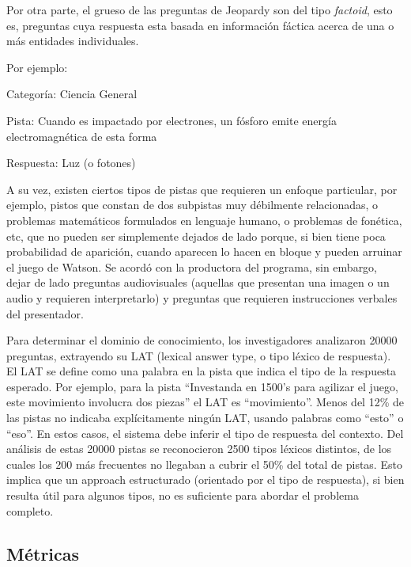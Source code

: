 Por otra parte, el grueso de las preguntas de Jeopardy son del tipo
\textit{factoid}, esto es, preguntas cuya respuesta esta basada en
informaci\'on f\'actica acerca de una o m\'as entidades individuales.


\bigskip

Por ejemplo:

Categor\'ia: Ciencia General

Pista: Cuando es impactado por electrones, un f\'osforo emite energ\'ia
electromagn\'etica de esta forma

Respuesta: Luz (o fotones)


\bigskip

A su vez, existen ciertos tipos de pistas que requieren un enfoque
particular, por ejemplo, pistos que constan de dos subpistas muy
d\'ebilmente relacionadas, o problemas matem\'aticos formulados en
lenguaje humano, o problemas de fon\'etica, etc, que no pueden ser
simplemente dejados de lado porque, si bien tiene poca probabilidad de
aparici\'on, cuando aparecen lo hacen en bloque y pueden arruinar el
juego de Watson. Se acord\'o con la productora del programa, sin
embargo, dejar de lado preguntas audiovisuales (aquellas que presentan
una imagen o un audio y requieren interpretarlo) y preguntas que
requieren instrucciones verbales del presentador.


\bigskip

Para determinar el dominio de conocimiento, los investigadores
analizaron 20000 preguntas, extrayendo su LAT (lexical answer type, o
tipo l\'exico de respuesta). El LAT se define como una palabra en la
pista que indica el tipo de la respuesta esperado. Por ejemplo, para la
pista {\textquotedblleft}Investanda en 1500{\textquoteright}s para
agilizar el juego, este movimiento involucra dos
piezas{\textquotedblright} el LAT es
{\textquotedblleft}movimiento{\textquotedblright}. Menos del 12\% de
las pistas no indicaba expl\'icitamente ning\'un LAT, usando palabras
como {\textquotedblleft}esto{\textquotedblright} o
{\textquotedblleft}eso{\textquotedblright}. En estos casos, el sistema
debe inferir el tipo de respuesta del contexto. Del an\'alisis de estas
20000 pistas se reconocieron 2500 tipos l\'exicos distintos, de los
cuales los 200 m\'as frecuentes no llegaban a cubrir el 50\% del total
de pistas. Esto implica que un approach estructurado (orientado por el
tipo de respuesta), si bien resulta \'util para algunos tipos, no es
suficiente para abordar el problema completo.

\subsection{M\'etricas}

